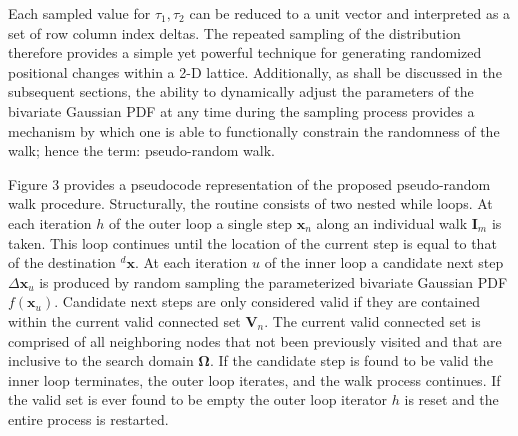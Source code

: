 Each sampled value for $\tau_1, \tau_2$ can be reduced to a unit vector and interpreted as a set of row column index deltas. The repeated sampling of the distribution therefore provides a simple yet powerful technique for generating randomized positional changes within a 2-D lattice. Additionally, as shall be discussed in the subsequent sections, the ability to dynamically adjust the parameters of the bivariate Gaussian PDF at any time during the sampling process provides a mechanism by which one is able to functionally constrain the randomness of the walk; hence the term: pseudo-random walk.
            
Figure 3 provides a pseudocode representation of the proposed pseudo-random walk procedure. Structurally, the routine consists of two nested while loops. At each iteration $h$ of the outer loop a single step $\textbf{x}_n$ along an individual walk $\textbf{I}_m$ is taken. This loop continues until the location of the current step is equal to that of the destination ${}^{d}\textbf{x}$. At each iteration $u$ of the inner loop a candidate next step $\Delta \textbf{x}_u$ is produced by random sampling the parameterized bivariate Gaussian PDF $f(\textbf{x}_u)$. Candidate next steps are only considered valid if they are contained within the current valid connected set $\textbf{V}_n$. The current valid connected set is comprised of all neighboring nodes that not been previously visited and that are inclusive to the search domain $\boldsymbol{\Omega}$.  If the candidate step is found to be valid the inner loop terminates, the outer loop iterates, and the walk process continues. If the valid set is ever found to be empty the outer loop iterator $h$ is reset and the entire process is restarted. \\
            
